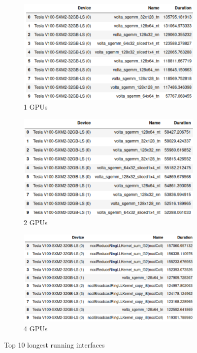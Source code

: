 \begin{figure}[htbp]
    \centering
    \begin{subfigure}{.5\textwidth}
        \centering
        \includegraphics[width=\linewidth]{fig/bert/bert_t1.png}
        \caption{1 GPUs}
        \label{fig:bert:timegroup}
    \end{subfigure}%
    \begin{subfigure}{.5\textwidth}
        \centering
        \includegraphics[width=\linewidth]{fig/bert/bert_t2.png}
        \caption{2 GPUs}
        \label{fig:bert:timegroup_frac}
    \end{subfigure}
    \begin{subfigure}{.6\textwidth}
        \centering
        \includegraphics[width=\linewidth]{fig/bert/bert_t4.png}
        \caption{4 GPUs}
        \label{fig:bert:timegroup_frac}
    \end{subfigure}    
    \caption{Top 10 longest running interfaces}
\label{fig:bert:tg}
\end{figure}


